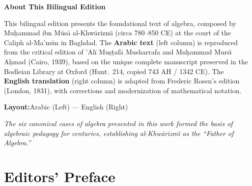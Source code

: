 \documentclass[10pt,a4paper]{book}
\begin{document}
\thispagestyle{empty}
\begin{center}
\vspace*{2cm}

{\Large\textbf{About This Bilingual Edition}}

\vspace{0.8cm}

\begin{minipage}{0.85\textwidth}
\small
This bilingual edition presents the foundational text of algebra, composed by
Mu\d{h}ammad ibn M\=us\=a al-Khw\=arizm\"{\i} (circa 780--850 CE) at the court
of the Caliph al-Ma'm\=un in Baghdad. The \textbf{Arabic text} (left column) is
reproduced from the critical edition of 'Al\=i Mu\d{s}\d{t}af\=a Musharrafa and
Mu\d{h}ammad Murs\"{\i} A\d{h}mad (Cairo, 1939), based on the unique complete
manuscript preserved in the Bodleian Library at Oxford (Hunt.~214, copied 743 AH
/ 1342 CE). The \textbf{English translation} (right column) is adapted from
Frederic Rosen's edition (London, 1831), with corrections and modernization of
mathematical notation.

\vspace{0.5cm}

\begin{center}
\textbf{Layout:}\quad Arabic (Left) --- English (Right)
\end{center}

\vspace{0.5cm}

\textit{The six canonical cases of algebra presented in this work formed the
basis of algebraic pedagogy for centuries, establishing al-Khw\=arizm\"{\i} as
the ``Father of Algebra.''}
\end{minipage}
\end{center}

\newpage

\tableofcontents
\newpage


\chapter*{Editors' Preface}
\end{document}
